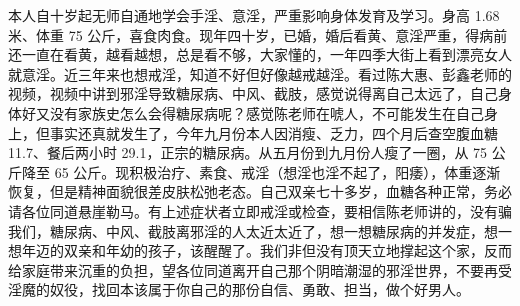 \begin{case}
    本人自十岁起无师自通地学会手淫、意淫，严重影响身体发育及学习。身高 1.68 米、体重 75 公斤，喜食肉食。现年四十岁，已婚，婚后看黄、意淫严重，得病前还一直在看黄，越看越想，总是看不够，大家懂的，一年四季大街上看到漂亮女人就意淫。近三年来也想戒淫，知道不好但好像越戒越淫。看过陈大惠、彭鑫老师的视频，视频中讲到邪淫导致糖尿病、中风、截肢，感觉说得离自己太远了，自己身体好又没有家族史怎么会得糖尿病呢？感觉陈老师在唬人，不可能发生在自己身上，但事实还真就发生了，今年九月份本人因消瘦、乏力，四个月后查空腹血糖 11.7、餐后两小时 29.1，正宗的糖尿病。从五月份到九月份人瘦了一圈，从 75 公斤降至 65 公斤。现积极治疗、素食、戒淫（想淫也淫不起了，阳痿），体重逐渐恢复，但是精神面貌很差皮肤松弛老态。自己双亲七十多岁，血糖各种正常，务必请各位同道悬崖勒马。有上述症状者立即戒淫或检查，要相信陈老师讲的，没有骗我们，糖尿病、中风、截肢离邪淫的人太近太近了，想一想糖尿病的并发症，想一想年迈的双亲和年幼的孩子，该醒醒了。我们非但没有顶天立地撑起这个家，反而给家庭带来沉重的负担，望各位同道离开自己那个阴暗潮湿的邪淫世界，不要再受淫魔的奴役，找回本该属于你自己的那份自信、勇敢、担当，做个好男人。


\end{case}
